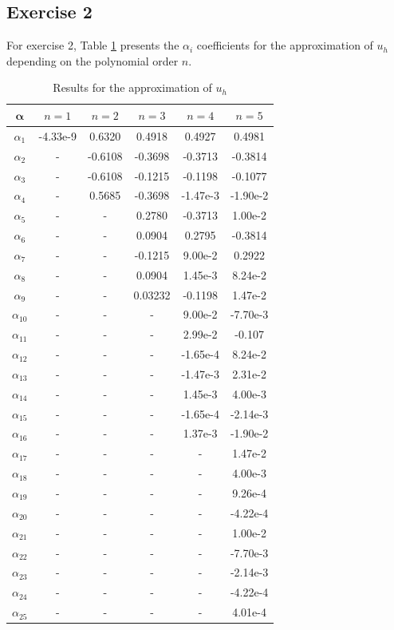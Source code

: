\subsection{Exercise 2}\label{subsec:exercise_2}
For exercise 2, Table
\ref{tab:results_ex2} presents the $\alpha_i$ coefficients for the approximation of $u_h$ depending on the polynomial order $n$. 
\begin{table}[htb!]
    \centering
    \caption{Results for the approximation of $u_h$}
    \begin{tabular}{cccccc}
        \hline
        $\bm{\alpha}$ & $n=1$ & $n=2$ & $n=3$ & $n=4$ & $n=5$ \\ \hline
        $\alpha_1$ & -4.33e-9 & 0.6320 & 0.4918 & 0.4927 & 0.4981 \\
        $\alpha_2$ & - & -0.6108 & -0.3698 & -0.3713 & -0.3814 \\
        $\alpha_3$ & - & -0.6108 & -0.1215 & -0.1198 & -0.1077 \\
        $\alpha_4$ & - & 0.5685 & -0.3698 & -1.47e-3 & -1.90e-2 \\
        $\alpha_5$ & - & - & 0.2780 & -0.3713 & 1.00e-2 \\ 
        $\alpha_6$ & - & - & 0.0904 & 0.2795 & -0.3814 \\ 
        $\alpha_7$ & - & - & -0.1215 & 9.00e-2 & 0.2922 \\ 
        $\alpha_8$ & - & - & 0.0904 & 1.45e-3 & 8.24e-2 \\ 
        $\alpha_9$ & - & - & 0.03232 & -0.1198 & 1.47e-2 \\
        $\alpha_{10}$ & - & - & - & 9.00e-2 & -7.70e-3 \\
        $\alpha_{11}$ & - & - & - & 2.99e-2 & -0.107 \\
        $\alpha_{12}$ & - & - & - & -1.65e-4 & 8.24e-2 \\
        $\alpha_{13}$ & - & - & - & -1.47e-3 & 2.31e-2 \\
        $\alpha_{14}$ & - & - & - & 1.45e-3 & 4.00e-3 \\
        $\alpha_{15}$ & - & - & - & -1.65e-4 & -2.14e-3 \\
        $\alpha_{16}$ & - & - & - & 1.37e-3 & -1.90e-2 \\
        $\alpha_{17}$ & - & - & - & - & 1.47e-2 \\
        $\alpha_{18}$ & - & - & - & - & 4.00e-3 \\
        $\alpha_{19}$ & - & - & - & - & 9.26e-4 \\
        $\alpha_{20}$ & - & - & - & - & -4.22e-4 \\
        $\alpha_{21}$ & - & - & - & - & 1.00e-2 \\
        $\alpha_{22}$ & - & - & - & - & -7.70e-3 \\
        $\alpha_{23}$ & - & - & - & - & -2.14e-3 \\
        $\alpha_{24}$ & - & - & - & - & -4.22e-4 \\
        $\alpha_{25}$ & - & - & - & - & 4.01e-4 \\\hline
    \end{tabular}
    \label{tab:results_ex2}
\end{table}

